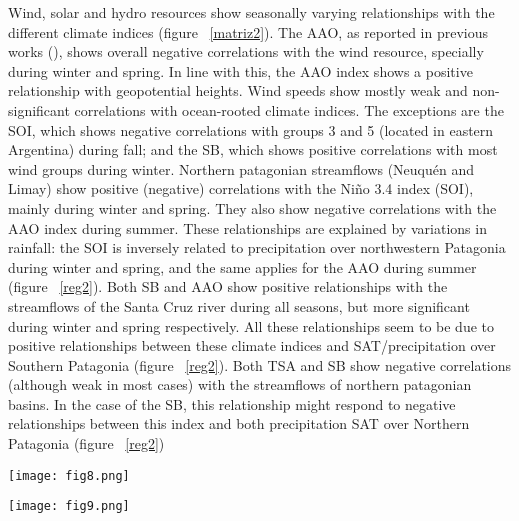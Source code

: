 \documentclass[AMA,Times1COL]{WileyNJDv5} %
\begin{document}
\begin{linenumbers}
Wind, solar and hydro resources show seasonally varying relationships with the different climate indices (figure ~\ref{matriz2}). The AAO, as reported in previous works (\cite{bianchi2022assessing}), shows overall negative correlations with the wind resource, specially during winter and spring. In line with this, the AAO index shows a positive relationship with geopotential heights. Wind speeds show mostly weak and non-significant correlations with ocean-rooted climate indices. The exceptions are the SOI, which shows negative correlations with groups 3 and 5 (located in eastern Argentina) during fall; and the SB, which shows positive correlations with most wind groups during winter. Northern patagonian streamflows (Neuquén and Limay) show positive (negative) correlations with the Niño 3.4 index (SOI), mainly during  winter and spring. They also show negative correlations with the AAO index during summer. These relationships are explained by variations in rainfall: the SOI is inversely related to precipitation over northwestern Patagonia during winter and spring, and the same applies for the AAO during summer (figure ~\ref{reg2}). Both SB and AAO show positive relationships with the streamflows of the Santa Cruz river during all seasons, but more significant during winter and spring respectively. All these relationships seem to be due to positive relationships between these climate indices and SAT/precipitation over Southern Patagonia (figure ~\ref{reg2}). Both TSA and SB show negative correlations (although weak in most cases) with the streamflows of northern patagonian basins. In the case of the SB, this relationship might respond to negative relationships between this index and both precipitation SAT over Northern Patagonia (figure ~\ref{reg2})

\begin{figure*}[hbpt]
	\centering
	\hspace*{-1cm}   
	\texttt{[image: fig8.png]}
	\caption{\label{matriz2} Correlation matrices between three-monthy (seasonal) mean climate indices and solar, wind and hydro time series.}
\end{figure*}

\begin{figure*}[hbpt]
	\centering
	\hspace*{-1cm}   
	\texttt{[image: fig9.png]}
	\caption{\label{reg2} Seasonal regression maps between AAO, SOI, SB and PDO indices and 925 mb geopotential heights (contours: red contours indicate positive geopotential values, blue contours indicate negative geopotential values), precipitation (left pannels) and SAT (right pannels). Blue dots indicate the location of wind sites. Black triangles indicate the location of streamflow measurement gauges. Elevations above 1500 m.a.s.l. are masked.}
\end{figure*}


\end{linenumbers}
\end{document}
